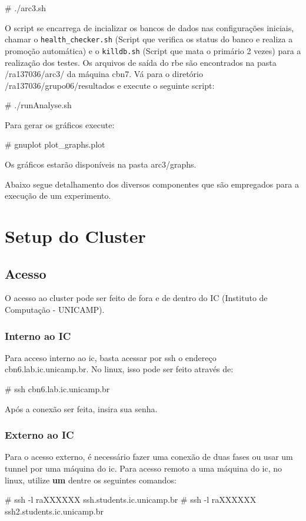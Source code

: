 \documentclass[a4paper,10pt]{article}
\begin{document}
    \begin{spverbatim}
# ./arc3.sh
    \end{spverbatim}

    
    O script se encarrega de incializar os bancos de dados nas configurações iniciais, chamar o \verb|health_checker.sh| (Script que verifica os status do banco e realiza a promoção automática) e o \verb|killdb.sh| (Script que mata o primário 2 vezes) para a realização dos testes. Os arquivos de saída do rbe são encontrados na pasta /ra137036/arc3/ da máquina cbn7. Vá para o diretório /ra137036/grupo06/resultados e execute o seguinte script:
    
    \begin{spverbatim}
# ./runAnalyse.sh
    \end{spverbatim}

    Para gerar os gráficos execute:
    \begin{spverbatim}
# gnuplot plot_graphs.plot
    \end{spverbatim}

     Os gráficos estarão disponíveis na pasta arc3/graphs.
     
	Abaixo segue detalhamento dos diversos componentes que são empregados para a execução de um experimento.

\section{Setup do Cluster}
    \subsection{Acesso}
    O acesso ao cluster pode ser feito de fora e de dentro do IC (Instituto de Computação - UNICAMP).
        \subsubsection{Interno ao IC}
        Para acceso interno ao ic, basta acessar por ssh o endereço cbn6.lab.ic.unicamp.br. No linux, isso pode ser feito através de:
        \begin{spverbatim}
        # ssh cbn6.lab.ic.unicamp.br
        \end{spverbatim}

        Após a conexão ser feita, insira sua senha.
        \subsubsection{Externo ao IC}
        Para o acesso externo, é necessário fazer uma conexão de duas fases ou usar um tunnel por uma máquina do ic. Para acesso remoto a uma máquina do ic, no linux, utilize \textbf{um} dentre os seguintes comandos:
        \begin{spverbatim}
        # ssh -l raXXXXXX ssh.students.ic.unicamp.br
        # ssh -l raXXXXXX ssh2.students.ic.unicamp.br
        \end{spverbatim}
\end{document}
